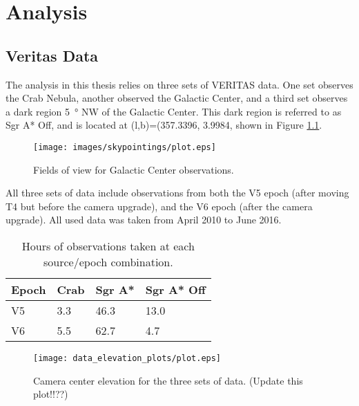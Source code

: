 \cleartooddpage[\thispagestyle{empty}]
\chapter{Analysis}

\section{Veritas Data}
  The analysis in this thesis relies on three sets of VERITAS data.
  One set observes the Crab Nebula, another observed the Galactic Center, and a third set observes a dark region \SI{5}{\degree} NW of the Galactic Center.
  This dark region is referred to as  Sgr A* Off, and is located at (l,b)=(357.3396\degree, 3.9984\degree, shown in Figure \ref{fig:gcfieldsofview}.

  \begin{figure}[ht]
    \begin{center}
      \texttt{[image: images/skypointings/plot.eps]}
      \caption[VERITAS Galactic Center Pointings]{Fields of view for Galactic Center observations.}\label{fig:gcfieldsofview}
    \end{center}
  \end{figure}

  All three sets of data include observations from both the V5 epoch (after moving T4 but before the camera upgrade), and the V6 epoch (after the camera upgrade).
  All used data was taken from April 2010 to June 2016.

  \begin{table}[]
    \centering
    \caption{Hours of observations taken at each source/epoch combination.}
    \label{my-label}
    \begin{tabular}{|l|l|l|l|}
      \hline
      \textbf{Epoch} & \textbf{Crab} & \textbf{Sgr A*} & \textbf{Sgr A* Off} \\ \hline
      V5             & 3.3           & 46.3            & 13.0                \\ \hline
      V6             & 5.5           & 62.7            & 4.7                 \\ \hline
    \end{tabular}
  \end{table}


  \begin{figure}[ht]
    \centering
    \texttt{[image: data\_elevation\_plots/plot.eps]}
    \caption[VERITAS Data Elevation Exposure]
    {Camera center elevation for the three sets of data. (Update this plot!!??)}
    \label{fig:datapointingelevations}
  \end{figure}

